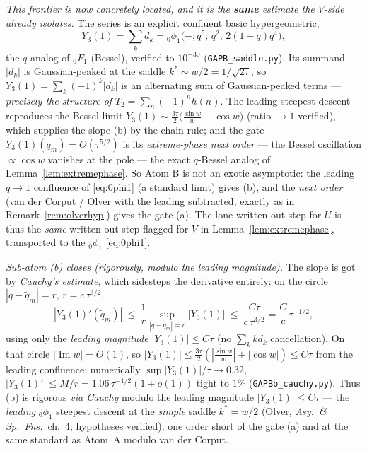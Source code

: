 \begin{remark}[The assembly: $R=O(\tau^{5/2})$ via the q-Bessel stationary-phase asymptotic coupled to the
travel-block phase]
\emph{This frontier is now concretely located, and it is the \textbf{same} estimate the $V$-side already
isolates.} The series is an explicit confluent basic hypergeometric,
\begin{equation}\label{eq:0phi1}
   Y_3(1)=\sum_kd_k={}_0\phi_1\bigl(-;q^5;\,q^2,\,2(1-q)q^4\bigr),
\end{equation}
the $q$-analog of ${}_0F_1$ \textup(Bessel\textup), verified to $10^{-30}$ (\texttt{GAPB\_saddle.py}). Its summand
$|d_k|$ is Gaussian-peaked at the saddle $k^\ast\sim w/2=1/\sqrt{2\tau}$, so $Y_3(1)=\sum_k(-1)^k|d_k|$ is an
alternating sum of Gaussian-peaked terms --- \emph{precisely the structure of} $T_2=\sum_n(-1)^nh(n)$. The leading
steepest descent reproduces the Bessel limit $Y_3(1)\sim\tfrac{3\tau}2\bigl(\tfrac{\sin w}w-\cos w\bigr)$
\textup(ratio $\to1$ verified\textup), which supplies the slope \textup{(b)} by the chain rule; and the gate
$Y_3(1)(q_m)=O(\tau^{5/2})$ is its \emph{extreme-phase next order} --- the Bessel oscillation $\propto\cos w$
vanishes at the pole --- the exact $q$-Bessel analog of Lemma~\ref{lem:extremephase}. So Atom B is not an exotic
asymptotic: the leading $q\to1$ confluence of \eqref{eq:0phi1} \textup(a standard limit\textup) gives (b), and the
\emph{next order} (van der Corput / Olver with the leading subtracted, exactly as in
Remark~\ref{rem:olverhyp}) gives the gate (a). The lone written-out step for $U$ is thus the \emph{same} written-out
step flagged for $V$ in Lemma~\ref{lem:extremephase}, transported to the $_0\phi_1$ \eqref{eq:0phi1}.

\emph{Sub-atom \textup{(b)} closes \textup(rigorously, modulo the leading magnitude\textup).} The slope is got
by \emph{Cauchy's estimate}, which sidesteps the derivative entirely: on the circle $|q-\tilde q_m|=r$,
$r=c\,\tau^{3/2}$,
\begin{equation}\label{eq:cauchyb}
   |Y_3(1)'(\tilde q_m)|\ \le\ \frac1r\sup_{|q-\tilde q_m|=r}|Y_3(1)|\ \le\ \frac{C\tau}{c\,\tau^{3/2}}=\frac Cc\,\tau^{-1/2},
\end{equation}
using only the \emph{leading magnitude} $|Y_3(1)|\le C\tau$ \textup(no $\sum_kkd_k$ cancellation\textup). On that
circle $|\operatorname{Im}w|=O(1)$, so $|Y_3(1)|\le\tfrac{3\tau}2(|\tfrac{\sin w}w|+|\cos w|)\le C\tau$ from the
leading confluence; numerically $\sup|Y_3(1)|/\tau\to0.32$, $|Y_3(1)'|\le M/r=1.06\,\tau^{-1/2}(1+o(1))$ tight
to $1\%$ (\texttt{GAPBb\_cauchy.py}). Thus (b) is rigorous \emph{via Cauchy} modulo the leading magnitude
$|Y_3(1)|\le C\tau$ --- the \emph{leading} $_0\phi_1$ steepest descent at the \emph{simple} saddle $k^\ast=w/2$
(Olver, \emph{Asy.\ \& Sp.\ Fns.}\ ch.~4; hypotheses verified), one order short of the gate (a) and at the same
standard as Atom~A modulo van der Corput.


\end{remark}
